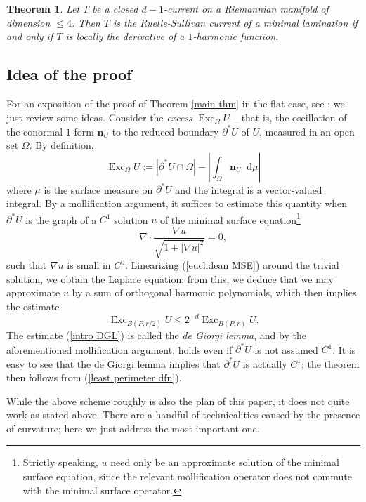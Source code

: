 \documentclass[reqno,11pt]{amsart}
\DeclareMathOperator{\Exc}{Exc}
\newcommand*\dif{\mathop{}\!\mathrm{d}}
\newcommand{\normal}{\mathbf n}
\newcommand{\dfn}[1]{\emph{#1}\index{#1}}
\newtheorem{theorem}{Theorem}[section]
\theoremstyle{definition}
\numberwithin{equation}{section}
\begin{document}
\begin{theorem}
Let $T$ be a closed $d-1$-current on a Riemannian manifold of dimension $\leq 4$.
Then $T$ is the Ruelle-Sullivan current of a minimal lamination if and only if $T$ is locally the derivative of a $1$-harmonic function.
\end{theorem}

\subsection{Idea of the proof}
For an exposition of the proof of Theorem \ref{main thm} in the flat case, see \cite[Chapters 6-9]{Giusti77}; we just review some ideas.
Consider the \dfn{excess} $\Exc_\Omega U$ -- that is, the oscillation of the conormal $1$-form $\normal_U$ to the reduced boundary $\partial^* U$ of $U$, measured in an open set $\Omega$.
By definition,
\begin{equation}\label{intro excess}
\Exc_\Omega U := |\partial^* U \cap \Omega| - \left|\int_\Omega \normal_U \dif \mu\right|
\end{equation}
where $\mu$ is the surface measure on $\partial^* U$ and the integral is a vector-valued integral.
By a mollification argument, it suffices to estimate this quantity when $\partial^* U$ is the graph of a $C^1$ solution $u$ of the minimal surface equation\footnote{Strictly speaking, $u$ need only be an approximate solution of the minimal surface equation, since the relevant mollification operator does not commute with the minimal surface operator.}
\begin{equation}\label{euclidean MSE}
\nabla \cdot \frac{\nabla u}{\sqrt{1 + |\nabla u|^2}} = 0,
\end{equation}
such that $\nabla u$ is small in $C^0$. 
Linearizing (\ref{euclidean MSE}) around the trivial solution, we obtain the Laplace equation; from this, we deduce that we may approximate $u$ by a sum of orthogonal harmonic polynomials, which then implies the estimate 
\begin{equation}\label{intro DGL}
\Exc_{B(P, r/2)} U \leq 2^{-d} \Exc_{B(P, r)} U.
\end{equation}
The estimate (\ref{intro DGL}) is called the \dfn{de Giorgi lemma}, and by the aforementioned mollification argument, holds even if $\partial^* U$ is not assumed $C^1$.
It is easy to see that the de Giorgi lemma implies that $\partial^* U$ is actually $C^1$; the theorem then follows from (\ref{least perimeter dfn}).

While the above scheme roughly is also the plan of this paper, it does not quite work as stated above.
There are a handful of technicalities caused by the presence of curvature; here we just address the most important one.
\end{document}
